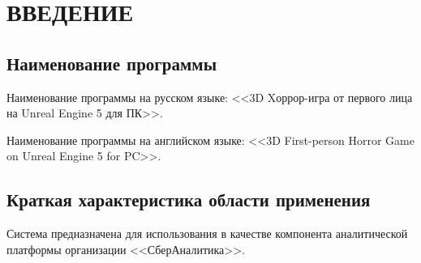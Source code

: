 \section{ВВЕДЕНИЕ}

\subsection{Наименование программы}

Наименование программы на русском языке: <<3D Xоррор-игра от первого лица на Unreal Engine 5 для ПК>>.

Наименование программы на английском языке:  <<3D First-person Horror Game on Unreal Engine 5 for PC>>.

\subsection{Краткая характеристика области применения}

Система предназначена для использования в качестве компонента аналитической платформы организации <<СберАналитика>>.